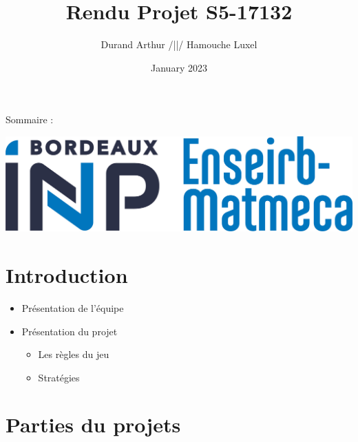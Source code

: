 \documentclass{article}
\title{Rendu Projet S5-17132}
\author{Durand Arthur /||/ Hamouche Luxel}
\date{January 2023}
\begin{document}
\maketitle Sommaire :
\begin{center}
  \includegraphics[scale=0.6]{logo_em.jpg}  
\end{center}
\newpage
\section{Introduction}

\begin{itemize}
    \item  Présentation de l'équipe 
    \item Présentation du projet 
    \begin{itemize}
        \item Les règles du jeu
        \item Stratégies 
    \end{itemize}
\end{itemize}


\section{Parties du projets}
\end{document}
